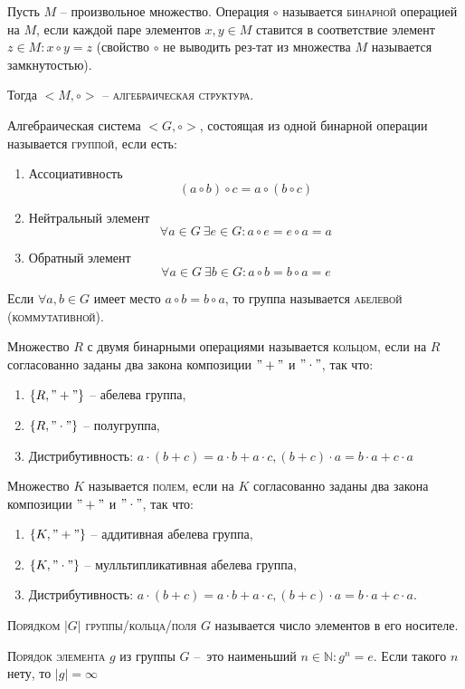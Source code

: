 \documentclass{article}
\begin{document}
Пусть $M$ – произвольное множество. Операция $\circ$ называется \textsc{бинарной} операцией на $M$, если каждой паре элементов
$x,y\in M$ ставится в соответствие элемент $z\in M\colon x\circ y=z$ (свойство $\circ$ не выводить рез-тат из множества $M$ называется замкнутостью).

Тогда $<M, \circ>$ – \textsc{алгебраическая структура}.

Алгебраическая система $<G, \circ>$, состоящая из одной бинарной операции называется \textsc{группой}, если есть:
\begin{enumerate}
\item Ассоциативность
$$(a\circ b)\circ c=a\circ(b\circ c)$$
\item Нейтральный элемент
$$\forall a\in G \ \exists e\in G\colon a\circ e=e\circ a=a$$
\item Обратный элемент
$$\forall a\in G \ \exists b\in G\colon a\circ b=b\circ a=e$$
\end{enumerate}

Если $\forall a,b\in G$ имеет место $a\circ b=b\circ a$, то группа называется \textsc{абелевой (коммутативной)}.

Множество $R$ с двумя бинарными операциями называется \textsc{кольцом}, если на $R$ согласованно заданы два закона композиции $"+"$ и $"\cdot"$, так что:
\begin{enumerate}
    \item $\{ R, "+"\}$ – абелева группа,
    \item $\{ R, "\cdot"\}$ – полугруппа,
    \item Дистрибутивность: $a\cdot(b+c)=a\cdot b+a\cdot c, (b+c)\cdot a=b\cdot a+c\cdot a$
\end{enumerate}

Множество $K$ называется \textsc{полем}, если на $K$ согласованно заданы два закона композиции $"+"$ и $"\cdot"$, так что:
\begin{enumerate}
    \item $\{K, "+"\}$ – аддитивная абелева группа,
    \item $\{K, "\cdot"\}$ – мулльтипликативная абелева группа,
    \item Дистрибутивность: $a\cdot(b+c)=a\cdot b+a\cdot c, (b+c)\cdot a=b\cdot a+c\cdot a.$
\end{enumerate}

\textsc{Порядком {$|G|$} группы/кольца/поля {$G$}} называется число элементов в его носителе. 

\textsc{Порядок элемента {$g$}} из группы $G$ – это наименьший $n\in \mathbb{N}\colon g^n=e.$ Если такого $n$ нету, то $|g|=\infty$
\end{document}
